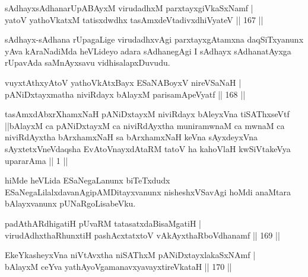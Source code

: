 \begin{shl}
sAdhayxsAdhanarUpABAyxM virudadhxM parxtayxgiVkaSxNamf |\\
yatoV yathoVkatxM tatisxdwdhx tasAmxdeVtadivxdhiVyateV \hfill || 167 ||
\end{shl}

\begin{artha}%
sAdhayx-sAdhana rUpagaLige virudadhxvAgi parxtayxgAtamxna daqSiTxyanunx yAva kAraNadiMda heVLideyo adara sAdhanegAgi I sAdhayx sAdhanatAyxga rUpavAda saMnAyxsavu vidhisalapxDuvudu.
\end{artha}

\begin{shl}
vuyxtAthxyAtoV yathoVkAtxBayx ESaNABoyxV nireVSaNaH |\\
pANiDxtayxmatha niviRdayx bAlayxM parisamApeVyatf \hfill || 168 ||
\end{shl}

\begin{kandikeshl}
tasAmxdAbxrXhamxNaH pANiDxtayxM niviRdayx bAleyxVna tiSAThxseVtf ||bAlayxM ca pANiDxtayxM ca niviRdAyxtha muniramwnaM ca mwnaM ca niviRdAyxtha bArxhamxNaH sa bArxhamxNaH keVna sAyxdeyxVna sAyxtetxVneVdaqsha EvAtoV\s nayxdAtaRM tatoV ha kahoVlaH kwSiVtakeVya upararAma || 1 ||
\end{kandikeshl}

\begin{artha}
hiMde heVLida ESaNegaLanunx biTeTxdudx ESaNegaLilalxdavanAgi\break pAMDitayxvanunx nisheshxVSavAgi hoMdi anaMtara bAlayxvanunx pUNaRgoLisabeVku.
\end{artha}


\begin{shl}
padAthARdhigatiH pUvaRM tatasatxdaBisaMgatiH |\\
virudAdhxthaRhunxtiH pashAcxtatxtoV vAkAyxthaRboVdhanamf \hfill || 169 ||
\end{shl}

\begin{shl}
EkeYkasheyxVna niVtAvx\s tha niSAThxM pANiDxtayxlakaSxNAmf |\\
bAlayxM ceYva yathAyoVgamanavxyavayxtireVkataH \hfill || 170 ||
\end{shl}


